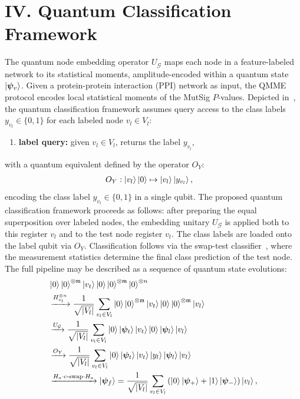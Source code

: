 \documentclass[
  reprint,
  superscriptaddress,
  amsmath,amssymb,
  aps,prl,
]{revtex4-2}
\begin{document}
\section{IV. Quantum Classification Framework}
%
%
\noindent
The quantum node embedding operator \(U_{\mathcal{G}}\) maps each node in a feature-labeled network to its statistical moments, amplitude-encoded within a quantum state \(\ket{\boldsymbol \psi_v}\). Given a protein-protein interaction (PPI) network as input, the QMME protocol encodes local statistical moments of the MutSig \(P\)-values. Depicted in~, the quantum classification framework assumes query access to the class labels \(y_{v_l}\in\{0,1\}\) for each labeled node \(v_l\in V_l\):
\begin{enumerate}
    \item \textbf{label query:} given \(v_l \in V_l\), returns the label \(y_{v_l}\),
\end{enumerate}
\noindent with a quantum equivalent defined by the operator \(O_Y\):
\begin{align}
    O_Y &:\ket{v_l} \ket{0} \mapsto \ket{v_l}\ket{y_{v_l}},
    \label{eq:label-oracle}
\end{align}
\noindent encoding the class label \(y_{v_l}\in\{0,1\}\) in a single qubit. 
%
The proposed quantum classification framework proceeds as follows: after preparing the equal superposition over labeled nodes, the embedding unitary \(U_\mathcal G\) is applied both to this register \(v_l\) and to the test node register \(v_t\). The class labels are loaded onto the label qubit via \(O_Y\). Classification follows via the swap-test classifier~\cite{blank2020quantum}, where the measurement statistics determine the final class prediction of the test node. 
The full pipeline may be described as a sequence of quantum state evolutions:
\begin{equation}
\begin{aligned}
    &\ket{0} \ket{0}^{\otimes \mathfrak{m}} \ket{v_t} \ket{0} \ket{0}^{\otimes \mathfrak{m}} \ket{0}^{\otimes n} \\
    &\xrightarrow{H^{\otimes n}_{v_l}} 
    \frac{1}{\sqrt{|V_l|}} \sum_{v_l \in V_l} \ket{0} \ket{0}^{\otimes \mathfrak{m}} \ket{v_t} \ket{0} \ket{0}^{\otimes \mathfrak{m}} \ket{v_l} \\
    &\xrightarrow{U_\mathcal{G}}
    \frac{1}{\sqrt{|V_l|}} \sum_{v_l \in V_l} \ket{0} \ket{\boldsymbol{\psi}_t} \ket{v_t} \ket{0} \ket{\boldsymbol{\psi}_l} \ket{v_l} \\
    &\xrightarrow{O_Y}
    \frac{1}{\sqrt{|V_l|}} \sum_{v_l \in V_l} \ket{0} \ket{\boldsymbol{\psi}_t} \ket{v_t} \ket{y_l} \ket{\boldsymbol{\psi}_l} \ket{v_l} \\
    &\xrightarrow{H_a \cdot \text{c-swap} \cdot H_a}\ket{\boldsymbol \psi_f}=
    \frac{1}{\sqrt{|V_l|}} \sum_{v_l \in V_l} \left( \ket{0} \ket{\boldsymbol{\psi}_+} + \ket{1} \ket{\boldsymbol{\psi}_-} \right) \ket{v_l},
\end{aligned}
\end{equation}
\end{document}
